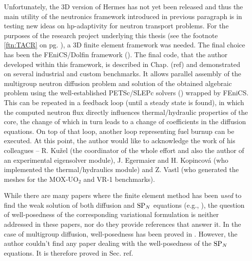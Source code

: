 Unfortunately, the 3D version of Hermes has not yet been released and thus the main utility of the neutronics framework
introduced in previous paragraph is in testing new ideas on hp-adaptivity for neutron transport problems. For the
purposes of the research project underlying this thesis (see the footnote \ref{ftn:TACR} on pg. \pageref{ftn:TACR}), a
3D finite element framework was needed. The final choice has been the FEniCS/Dolfin framework (\cite{dolfin1, dolfin2}).
The final code, that the author developed within this framework, is described in Chap. \alert(ref) and demonstrated on
several industrial and custom benchmarks. It allows parallel assembly of the multigroup neutron diffusion problem and
solution of the obtained algebraic problem using the well-established PETSc/SLEPc solvers (\cite{petsc1, slepc1})
wrapped by FEniCS.
This can be repeated in a feedback loop (until a steady state is found), in which the computed neutron flux directly influences
thermal/hydraulic properties of the core, the change of which in turn leads to a change of coefficients in the diffusion
equations. On top of that loop, another loop representing fuel burnup can be executed. At this point, the author would
like to acknowledge the work of his colleagues -- R. Ku{\v z}el (the coordinator of the whole effort and also the author
of an experimental eigensolver module), J. Egermaier and H. Kopincov{\' a} (who implemented the thermal/hydraulics
module) and Z. Vastl (who generated the meshes for the MOX-UO$_2$ and VR-1 benchmarks).

While there are many papers where the finite element method has been \textit{used} to find the weak solution of
both diffusion and $\text{SP}_{N}$ equations (e.g., \cite{Ragusa1, Hermes-nuclear, Ragusa2}), the question of well-posedness of
the corresponding variational formulation is neither addressed in these papers, nor do they provide references that
answer it. In the case of multigroup diffusion, well-posedness has been proved in \cite{Bourhrara1}. However, the author
couldn't find any paper dealing with the well-posedness of the $\text{SP}_{N}$ equations. It is therefore proved in Sec.
\alert{ref}.


